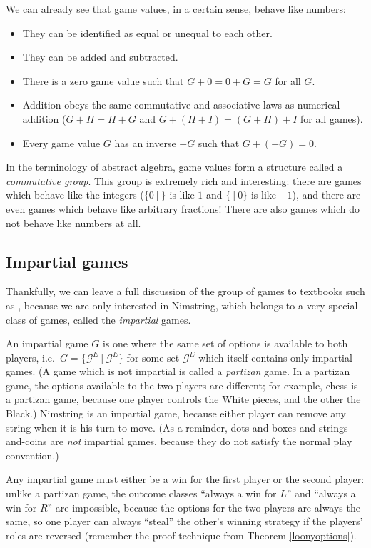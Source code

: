 \documentclass[a4paper,twocolumn]{article}
\newcommand{\cgtgame}[2]{\{#1 \:|\: #2\}}
\begin{document}
We can already see that game values, in a certain sense, behave like
numbers:

\begin{itemize}
  \item They can be identified as equal or unequal to each other.
  \item They can be added and subtracted.
  \item There is a zero game value such that $G + 0 = 0 + G = G$ for
    all $G$.
  \item Addition obeys the same commutative and associative laws as
    numerical addition ($G+H = H+G$ and $G+(H+I)=(G+H)+I$ for all
    games).
  \item Every game value $G$ has an inverse $-G$ such that $G + (-G) =
    0$.
\end{itemize}

In the terminology of abstract algebra, game values form a structure
called a \emph{commutative group}. This group is extremely rich and
interesting: there are games which behave like the integers
($\cgtgame{0}{}$ is like $1$ and $\cgtgame{}{0}$ is like $-1$), and
there are even games which behave like arbitrary fractions! There are
also games which do not behave like numbers at all.

\subsection{Impartial games}

Thankfully, we can leave a full discussion of the group of games to
textbooks such as \cite{lip}, because we are only interested in
Nimstring, which belongs to a very special class of games, called the
\emph{impartial} games.

An impartial game $G$ is one where the same set of options is
available to both players, i.e.\ $G =
\cgtgame{\mathcal{G}^E}{\mathcal{G}^E}$ for some set $\mathcal{G}^E$
which itself contains only impartial games. (A game which is not
impartial is called a \emph{partizan} game. In a partizan game, the
options available to the two players are different; for example, chess
is a partizan game, because one player controls the White pieces, and
the other the Black.) Nimstring is an impartial game, because either
player can remove any string when it is his turn to move. (As a
reminder, dots-and-boxes and strings-and-coins are \emph{not}
impartial games, because they do not satisfy the normal play
convention.)

Any impartial game must either be a win for the first player or the
second player: unlike a partizan game, the outcome classes ``always a
win for $L$'' and ``always a win for $R$'' are impossible, because the
options for the two players are always the same, so one player can
always ``steal'' the other's winning strategy if the players' roles
are reversed (remember the proof technique from Theorem
\ref{loonyoptions}).
\end{document}
